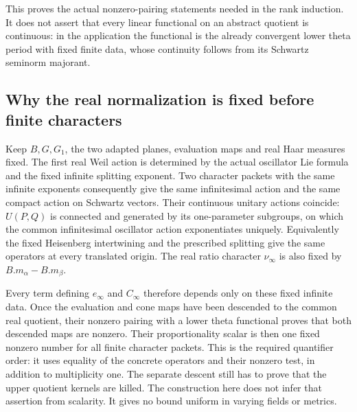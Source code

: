 This proves the actual nonzero-pairing statements
needed in the rank induction. It does not assert
that every linear functional on an abstract quotient
is continuous: in the application the functional is
the already convergent lower theta period with fixed
finite data, whose continuity follows from its
Schwartz seminorm majorant.

\subsection{Why the real normalization is fixed before finite characters}

Keep \(B,G,G_1\), the two adapted planes, evaluation
maps and real Haar measures fixed. The first real
Weil action is determined by the actual oscillator
Lie formula and the fixed infinite splitting exponent.
Two character packets with the same infinite
exponents consequently give the same infinitesimal
action and the same compact action on Schwartz
vectors. Their continuous unitary actions coincide:
\(U(P,Q)\) is connected and generated by its one-parameter
subgroups, on which the common infinitesimal oscillator
action exponentiates uniquely. Equivalently the fixed
Heisenberg intertwining and the prescribed splitting
give the same operators at every translated origin.
The real ratio character \(\nu_\infty\) is also fixed
by \(B.m_\alpha-B.m_\beta\).

Every term defining \(e_\infty\) and \(C_\infty\)
therefore depends only on these fixed infinite data.
Once the evaluation and cone maps have been descended
to the common real quotient, their nonzero pairing with
a lower theta functional proves that both descended
maps are nonzero. Their proportionality scalar is then
one fixed nonzero number for all finite character
packets. This is the required quantifier order:
it uses equality of the concrete operators and their
nonzero test, in addition to multiplicity one.
The separate descent still has to prove that the upper
quotient kernels are killed. The construction here
does not infer that assertion from scalarity.
It gives no bound uniform in varying fields or metrics.
